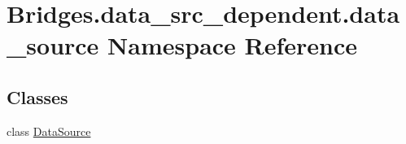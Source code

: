 \hypertarget{namespace_bridges_1_1data__src__dependent_1_1data__source}{}\section{Bridges.\+data\+\_\+src\+\_\+dependent.\+data\+\_\+source Namespace Reference}
\label{namespace_bridges_1_1data__src__dependent_1_1data__source}
\subsection*{Classes}
\begin{DoxyCompactItemize}
\item 
class \hyperlink{class_bridges_1_1data__src__dependent_1_1data__source_1_1_data_source}{Data\+Source}
\end{DoxyCompactItemize}
